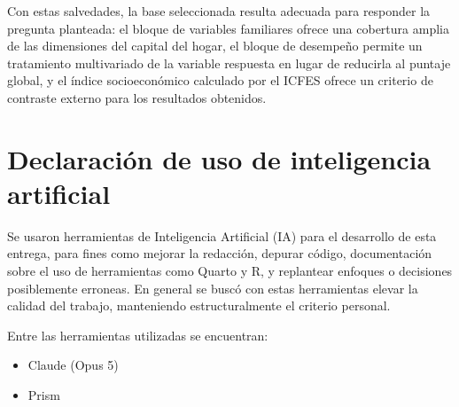 \documentclass[12pt]{article}
\begin{document}
Con estas salvedades, la base seleccionada resulta adecuada para responder la pregunta planteada: el bloque de variables familiares ofrece una cobertura amplia de las dimensiones del capital del hogar, el bloque de desempeño permite un tratamiento multivariado de la variable respuesta en lugar de reducirla al puntaje global, y el índice socioeconómico calculado por el ICFES ofrece un criterio de contraste externo para los resultados obtenidos.

\section{Declaración de uso de inteligencia artificial}
Se usaron herramientas de Inteligencia Artificial (IA) para el desarrollo de esta entrega, para fines como mejorar la redacción, 
depurar código, documentación sobre el uso de herramientas como Quarto y R, y replantear enfoques o decisiones posiblemente erroneas.
En general se buscó con estas herramientas elevar la calidad del trabajo, manteniendo estructuralmente el criterio personal.

Entre las herramientas utilizadas se encuentran:
\begin{itemize}
  \item Claude (Opus 5)
  \item Prism
\end{itemize}


\printbibliography[title={Referencias}]
\end{document}
